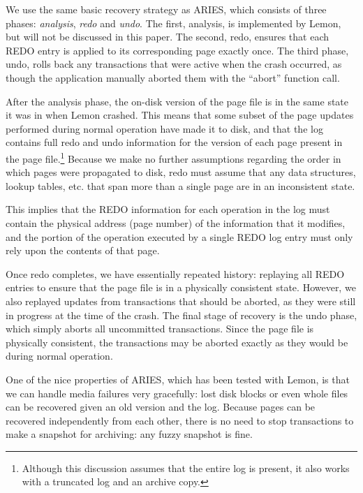 \documentclass[10pt,letterpaper,twocolumn,english]{article}
\newcommand{\yad}{Lemon\xspace}
\begin{document}
We use the same basic recovery strategy as ARIES, which consists of
three phases: {\em analysis}, {\em redo} and {\em undo}.  The first,
analysis, is implemented by \yad, but will not be discussed in this
paper. The second, redo, ensures that each REDO entry is applied to
its corresponding page exactly once.  The third phase, undo, rolls
back any transactions that were active when the crash occurred, as
though the application manually aborted them with the ``abort''
function call.
  
After the analysis phase, the on-disk version of the page file is in
the same state it was in when \yad crashed. This means that some
subset of the page updates performed during normal operation have made
it to disk, and that the log contains full redo and undo information
for the version of each page present in the page
file.\footnote{Although this discussion assumes that the entire log is
present, it also works with a truncated log and an archive copy.}
Because we make no further assumptions regarding the order in which
pages were propagated to disk, redo must assume that any data
structures, lookup tables, etc. that span more than a single page are
in an inconsistent state. 

This implies that the REDO information for each operation in the log
must contain the physical address (page number) of the information
that it modifies, and the portion of the operation executed by a
single REDO log entry must only rely upon the contents of that
page.

Once redo completes, we have essentially repeated history: replaying
all REDO entries to ensure that the page file is in a physically
consistent state.  However, we also replayed updates from transactions
that should be aborted, as they were still in progress at the time of
the crash.  The final stage of recovery is the undo phase, which simply
aborts all uncommitted transactions. Since the page file is physically
consistent, the transactions may be aborted exactly as they would be
during normal operation.

One of the nice properties of ARIES, which has been tested with \yad,
is that we can handle media failures very gracefully: lost disk blocks
or even whole files can be recovered given an old version and the log.
Because pages can be recovered independently from each other, there is
no need to stop transactions to make a snapshot for archiving: any
fuzzy snapshot is fine.
\end{document}
